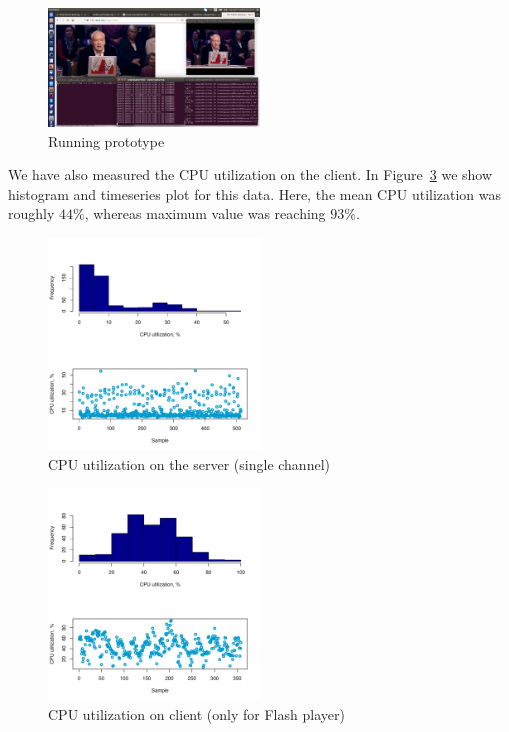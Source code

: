 \begin{figure}[ht]
\includegraphics[width=0.5\textwidth]{graphics/running.png}
\caption{Running prototype}
\label{fig:running}
\end{figure}

We have also measured the CPU utilization on the client.
In Figure~\ref{fig:cpu_client} we show histogram and timeseries
plot for this data. Here, the mean CPU utilization was roughly $44\%$, whereas 
maximum value was reaching $93\%$.

\begin{figure}[ht]
\includegraphics[width=0.5\textwidth]{graphics/microbanchmarking/cpu_usage_rpi.pdf}
\caption{CPU utilization on the server (single channel)}
\label{fig:cpu_server}
\end{figure}

\begin{figure}[ht]
\includegraphics[width=0.5\textwidth]{graphics/microbanchmarking/cpu_usage_client.pdf}
\caption{CPU utilization on client (only for Flash player)}
\label{fig:cpu_client}
\end{figure}

